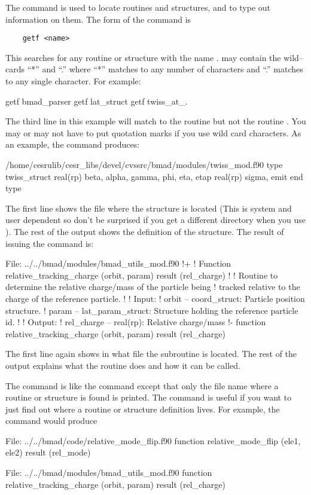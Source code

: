The  command is used to locate routines and structures, and
to type out information on them.  The form of the command is
\begin{verbatim}
    getf <name>
\end{verbatim}
This searches for any routine or structure with the name
.  may contain the wild--cards ``*'' and ``.'' where
``*'' matches to any number of characters and ``.'' matches to any
single character. For example:
\begin{example}
    getf bmad_parser
    getf lat_struct
    getf twiss_at_.
\end{example}
The third line in this example will match to the routine
 but not the routine . You may or
may not have to put quotation marks if you use wild card characters.
As an example, the command  produces:
\begin{example}
  /home/cesrulib/cesr_libs/devel/cvssrc/bmad/modules/twiss_mod.f90
    type twiss_struct
      real(rp) beta, alpha, gamma, phi, eta, etap
      real(rp) sigma, emit
    end type
\end{example}
The first line shows the file where the structure is located (This is
system and user dependent so don't be surprised if you get a different
directory when you use ). The rest of the output shows the
definition of the  structure.  The result of issuing
the command  is:
\begin{example}
  File: ../../bmad/modules/bmad_utils_mod.f90
  !+
  ! Function relative_tracking_charge (orbit, param) result (rel_charge)
  !
  ! Routine to determine the relative charge/mass of the particle being
  ! tracked relative to the charge of the reference particle.
  !
  ! Input:
  !   orbit -- coord_struct: Particle position structure.
  !   param -- lat_param_struct: Structure holding the reference particle id.
  !
  ! Output:
  !   rel_charge -- real(rp): Relative charge/mass
  !-
  function relative_tracking_charge (orbit, param) result (rel_charge)
\end{example}
The first line again shows in what file the subroutine is located.
The rest of the output explains what the routine does and how it
can be called.

The  command is like the  command except that only
the file name where a routine or structure is found is printed.
The  command is useful if you
want to just find out where a routine or structure definition lives.
For example, the  command would produce
\begin{example}
  File: ../../bmad/code/relative_mode_flip.f90
      function relative_mode_flip (ele1, ele2) result (rel_mode)

  File: ../../bmad/modules/bmad_utils_mod.f90
      function relative_tracking_charge (orbit, param) result (rel_charge)
\end{example}

